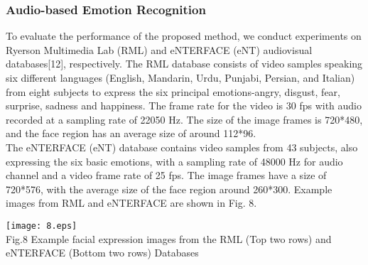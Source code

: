 \documentclass[journal]{IEEEtran}
\begin{document}
\subsubsection{Audio-based Emotion Recognition}

To evaluate the performance of the proposed method, we conduct experiments on Ryerson Multimedia Lab (RML) and eNTERFACE (eNT) audiovisual databases[12], respectively. The RML database consists of video samples speaking six different languages (English, Mandarin, Urdu, Punjabi, Persian, and Italian) from eight subjects to express the six principal emotions-angry, disgust, fear, surprise, sadness and happiness. The frame rate for the video is 30 fps with audio recorded at a sampling rate of 22050 Hz. The size of the image frames is 720*480, and the face region has an average size of around 112*96.\\\indent
The eNTERFACE (eNT) database contains video samples from 43 subjects, also expressing the six basic emotions, with a sampling rate of 48000 Hz for audio channel and a video frame rate of 25 fps. The image frames have a size of 720*576, with the average size of the face region around 260*300. Example images from RML and eNTERFACE are shown in Fig. 8.
\begin{figure*}[t]
\centering
\texttt{[image: 8.eps]}\\ Fig.8 Example facial expression images from the RML (Top two rows) and eNTERFACE (Bottom two rows) Databases\\
\end{figure*}
\end{document}
